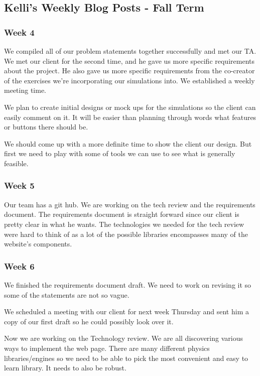 \subsection{Kelli's Weekly Blog Posts - Fall Term}
\subsubsection{Week 4}
We compiled all of our problem statements together successfully and met our TA. We met our client for the second time, and he gave us more specific requirements about the project. He also gave us more specific requirements from the co-creator of the exercises we're incorporating our simulations into. We established a weekly meeting time. 

We plan to create initial designs or mock ups for the simulations so the client can easily comment on it. It will be easier than planning through words what features or buttons there should be. 

We should come up with a more definite time to show the client our design. But first we need to play with some of tools we can use to see what is generally feasible.

\subsubsection{Week 5}
Our team has a git hub. We are working on the tech review and the requirements document. The requirements document is straight forward since our client is pretty clear in what he wants. The technologies we needed for the tech review were hard to think of as a lot of the possible libraries encompasses many of the website's components. 

\subsubsection{Week 6}
We finished the requirements document draft. We need to work on revising it so some of the statements are not so vague. 

We scheduled a meeting with our client for next week Thursday and sent him a copy of our first draft so he could possibly look over it.

Now we are working on the Technology review. We are all discovering various ways to implement the web page. There are many different physics libraries/engines so we need to be able to pick the most convenient and easy to learn library. It needs to also be robust. 


